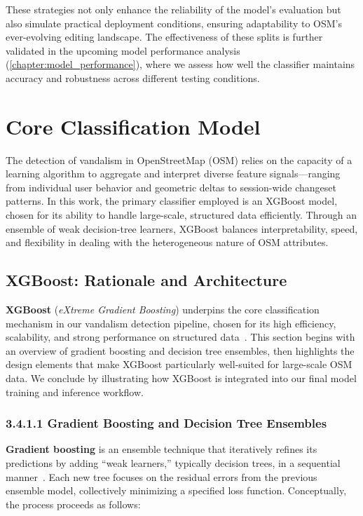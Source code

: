 \documentclass[
    13pt, %
    a4paper, %
    listof=totoc, %
    bibliography=totoc, %
    index=totoc, %
    headsepline
]{scrreprt}
\begin{document}
These strategies not only enhance the reliability of the model’s evaluation but also simulate practical deployment conditions, ensuring adaptability to OSM’s ever-evolving editing landscape. The effectiveness of these splits is further validated in the upcoming model performance analysis (\autoref{chapter:model_performance}), where we assess how well the classifier maintains accuracy and robustness across different testing conditions.


\section{Core Classification Model}
\label{sec:core_classification_model}

The detection of vandalism in OpenStreetMap (OSM) relies on the capacity of a learning algorithm to aggregate and interpret diverse feature signals—ranging from individual user behavior and geometric deltas to session-wide changeset patterns. In this work, the primary classifier employed is an XGBoost model, chosen for its ability to handle large-scale, structured data efficiently. Through an ensemble of weak decision-tree learners, XGBoost balances interpretability, speed, and flexibility in dealing with the heterogeneous nature of OSM attributes.

\subsection{XGBoost: Rationale and Architecture}
\label{sec:xgboost_rationale_architecture}

\noindent
\textbf{XGBoost} (\emph{eXtreme Gradient Boosting}) underpins the core classification mechanism in our vandalism detection pipeline, chosen for its high efficiency, scalability, and strong performance on structured data~\cite{chen2016xgboost}. This section begins with an overview of gradient boosting and decision tree ensembles, then highlights the design elements that make XGBoost particularly well-suited for large-scale OSM data. We conclude by illustrating how XGBoost is integrated into our final model training and inference workflow.

\subsubsection{3.4.1.1 Gradient Boosting and Decision Tree Ensembles}
\label{sec:xgboost_background}

\noindent
\textbf{Gradient boosting} is an ensemble technique that iteratively refines its predictions by adding “weak learners,” typically decision trees, in a sequential manner~\cite{friedman2001greedy}. Each new tree focuses on the residual errors from the previous ensemble model, collectively minimizing a specified loss function. Conceptually, the process proceeds as follows:
\end{document}
